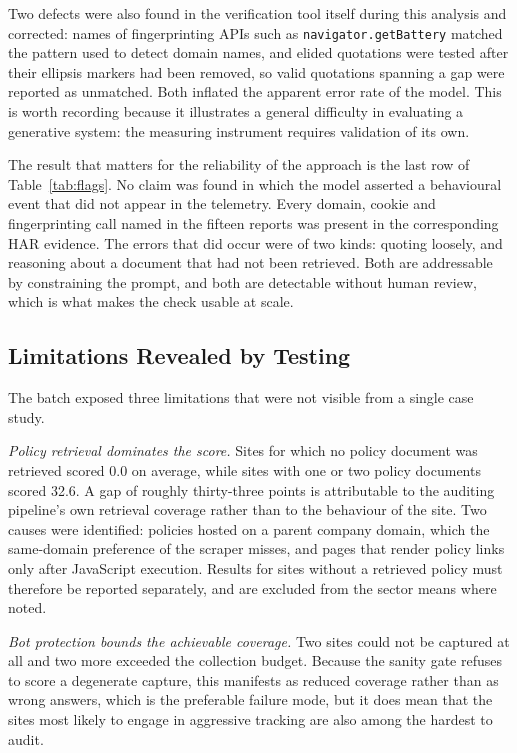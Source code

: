 \documentclass[conference]{IEEEtran}
\begin{document}
Two defects were also found in the verification tool itself during this analysis and corrected: names of fingerprinting APIs such as \texttt{navigator.getBattery} matched the pattern used to detect domain names, and elided quotations were tested after their ellipsis markers had been removed, so valid quotations spanning a gap were reported as unmatched. Both inflated the apparent error rate of the model. This is worth recording because it illustrates a general difficulty in evaluating a generative system: the measuring instrument requires validation of its own.

The result that matters for the reliability of the approach is the last row of Table~\ref{tab:flags}. No claim was found in which the model asserted a behavioural event that did not appear in the telemetry. Every domain, cookie and fingerprinting call named in the fifteen reports was present in the corresponding HAR evidence. The errors that did occur were of two kinds: quoting loosely, and reasoning about a document that had not been retrieved. Both are addressable by constraining the prompt, and both are detectable without human review, which is what makes the check usable at scale.

\subsection{Limitations Revealed by Testing}
\label{sec:limits}
The batch exposed three limitations that were not visible from a single case study.

\emph{Policy retrieval dominates the score.} Sites for which no policy document was retrieved scored 0.0 on average, while sites with one or two policy documents scored 32.6. A gap of roughly thirty-three points is attributable to the auditing pipeline's own retrieval coverage rather than to the behaviour of the site. Two causes were identified: policies hosted on a parent company domain, which the same-domain preference of the scraper misses, and pages that render policy links only after JavaScript execution. Results for sites without a retrieved policy must therefore be reported separately, and are excluded from the sector means where noted.

\emph{Bot protection bounds the achievable coverage.} Two sites could not be captured at all and two more exceeded the collection budget. Because the sanity gate refuses to score a degenerate capture, this manifests as reduced coverage rather than as wrong answers, which is the preferable failure mode, but it does mean that the sites most likely to engage in aggressive tracking are also among the hardest to audit.
\end{document}
